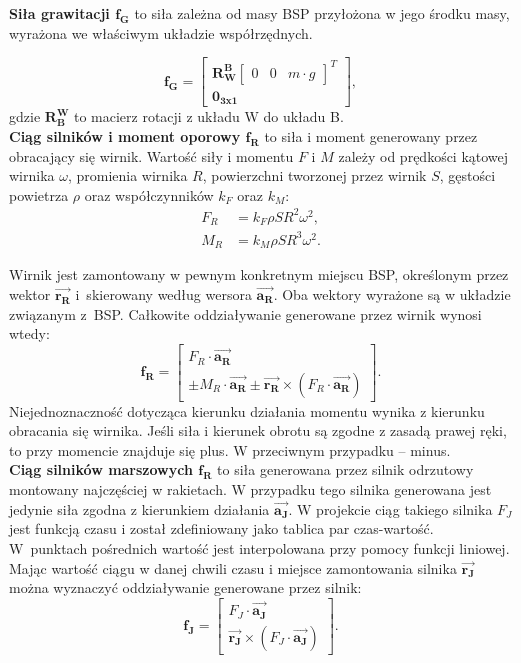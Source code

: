 \textbf{Siła grawitacji  $\bm{f_G}$} to siła zależna od masy BSP przyłożona w jego środku masy, wyrażona we właściwym układzie współrzędnych.

\[
	 \bm{f_G} = \begin{bmatrix} \bm{R_W^B}\begin{bmatrix}0 & 0 & m \cdot g\end{bmatrix}^T  \\ \bm{0_{3x1}}  \end{bmatrix},
\]
gdzie $\bm{R_B^W}$ to macierz rotacji z układu W do układu B.\\

\textbf{Ciąg silników i moment oporowy  $\bm{f_R}$} to siła i moment generowany przez obracający się wirnik. Wartość siły i momentu $F$ i $M$ zależy od prędkości kątowej wirnika $\omega$, promienia wirnika $R$, powierzchni tworzonej przez wirnik $S$, gęstości powietrza $\rho$ oraz współczynników $k_F$ oraz $k_M$:
\[
	\begin{aligned}
	F_R & = k_F \rho S R^2 \omega^2,\\
	M_R & = k_M \rho S R^3 \omega^2.
	\end{aligned}
\]

Wirnik jest zamontowany w pewnym konkretnym miejscu BSP, określonym przez wektor $\bm{\vec{r_R}}$ i~skierowany według wersora $\bm{\vec{a_R}}$. Oba wektory wyrażone są w układzie związanym z~BSP. Całkowite oddziaływanie generowane przez wirnik wynosi wtedy:
\[
	\bm{f_R} =  \begin{bmatrix} F_R \cdot  \bm{\vec{a_R}} \\   \pm M_R \cdot \bm{\vec{a_R}} \pm  \bm{\vec{r_R}} \times \left( F_R \cdot  \bm{\vec{a_R}} \right) \end{bmatrix}.
\]
Niejednoznaczność dotycząca kierunku działania momentu wynika z kierunku obracania się wirnika. Jeśli siła i kierunek obrotu są zgodne z zasadą prawej ręki, to przy momencie znajduje się plus. W przeciwnym przypadku -- minus.\\

\textbf{Ciąg silników marszowych $\bm{f_R}$} to siła generowana przez silnik odrzutowy montowany najczęściej w rakietach. W przypadku tego silnika generowana jest jedynie siła zgodna z kierunkiem działania $\bm{\vec{a_J}}$. W projekcie ciąg takiego silnika $F_J$ jest funkcją czasu i został zdefiniowany jako tablica par czas-wartość. W~punktach pośrednich wartość jest interpolowana przy pomocy funkcji liniowej. Mając wartość ciągu w danej chwili czasu i miejsce zamontowania silnika $\bm{\vec{r_J}}$ można wyznaczyć oddziaływanie generowane przez silnik:
\[
	\bm{f_J} =  \begin{bmatrix} F_J \cdot  \bm{\vec{a_J}} \\  \bm{\vec{r_J}} \times \left( F_J \cdot  \bm{\vec{a_J}} \right) \end{bmatrix}.
\]

